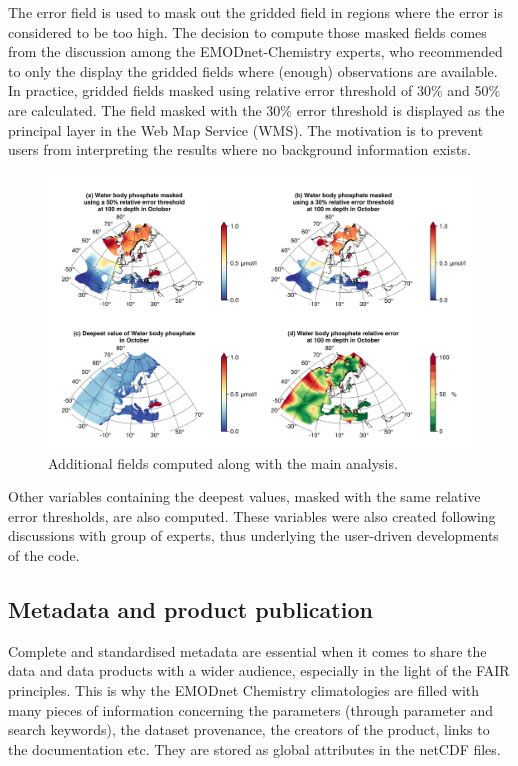 \documentclass[essd, manuscript]{copernicus}
\begin{document}
The error field is used to mask out the gridded field in regions where the error is considered to be too high. The decision to compute those masked fields comes from the discussion among the EMODnet-Chemistry experts, who recommended to only the display the gridded fields where (enough) observations are available. In practice, gridded fields masked using relative error threshold of 30\% and 50\% are calculated. The field masked with the 30\% error threshold is displayed as the principal layer in the Web Map Service (WMS). The motivation is to prevent users from interpreting the results where no background information exists. 

\begin{figure}[t]
\includegraphics[width=\textwidth]{Water_body_phosphate_depth-100_month-10_additional_fields.png}
\caption{Additional fields computed along with the main analysis.\label{fig:additionalfields}}
\end{figure}

Other variables containing the deepest values, masked with the same relative error thresholds, are also computed. These variables were also created following discussions with group of experts, thus underlying the user-driven developments of the code.

\subsection{Metadata and product publication}

Complete and standardised metadata are essential when it comes to share the data and data products with a wider audience, especially in the light of the FAIR principles. This is why the EMODnet Chemistry climatologies are filled with many pieces of information concerning the parameters (through parameter and search keywords), the dataset provenance, the creators of the product, links to the documentation etc. They are stored as global attributes in the netCDF files.
\end{document}
